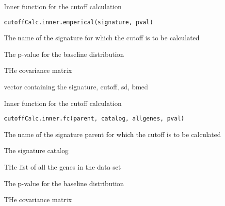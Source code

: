 \documentclass[letterpaper]{book}
\begin{document}
%
\begin{Description}\relax
Inner function for the cutoff calculation
\end{Description}
%
\begin{Usage}
\begin{verbatim}
cutoffCalc.inner.emperical(signature, pval)
\end{verbatim}
\end{Usage}
%
\begin{Arguments}
\begin{ldescription}
\item[\code{signature}] The name of the signature  for which the cutoff is to be calculated

\item[\code{pval}] The p-value for the baseline distribution

\item[\code{covmat}] THe covariance matrix
\end{ldescription}
\end{Arguments}
%
\begin{Value}
vector containing the signature, cutoff, sd, bmed
\end{Value}
%
\begin{Description}\relax
Inner function for the cutoff calculation
\end{Description}
%
\begin{Usage}
\begin{verbatim}
cutoffCalc.inner.fc(parent, catalog, allgenes, pval)
\end{verbatim}
\end{Usage}
%
\begin{Arguments}
\begin{ldescription}
\item[\code{parent}] The name of the signature parent for which the cutoff is to be calculated

\item[\code{catalog}] The signature catalog

\item[\code{allgenes}] THe list of all the genes in the data set

\item[\code{pval}] The p-value for the baseline distribution

\item[\code{covmat}] THe covariance matrix
\end{ldescription}
\end{Arguments}
\end{document}
